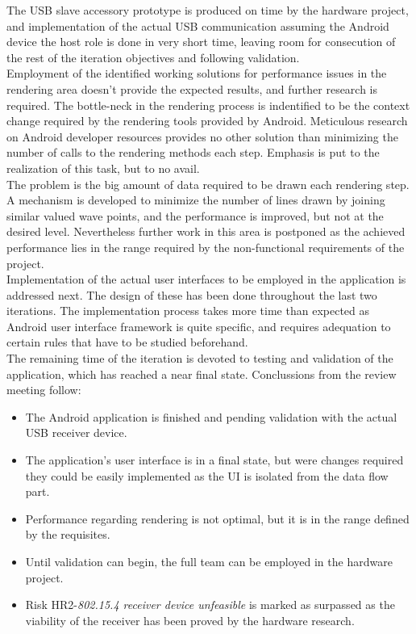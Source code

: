 			The USB slave accessory prototype is produced on time by the hardware project, and implementation of the actual USB communication assuming the Android device the host role is done in very short time, leaving room for consecution of the rest of the iteration objectives and following validation.\\

			Employment of the identified working solutions for performance issues in the rendering area doesn't provide the expected results, and further research is required. The bottle-neck in the rendering process is indentified to be the context change required by the rendering tools provided by Android. Meticulous research on Android developer resources provides no other solution than minimizing the number of calls to the rendering methods each step. Emphasis is put to the realization of this task, but to no avail.\\

			The problem is the big amount of data required to be drawn each rendering step. A mechanism is developed to minimize the number of lines drawn by joining similar valued wave points, and the performance is improved, but not at the desired level. Nevertheless further work in this area is postponed as the achieved performance lies in the range required by the non-functional requirements of the project.\\

			Implementation of the actual user interfaces to be employed in the application is addressed next. The design of these has been done throughout the last two iterations. The implementation process takes more time than expected as	Android user interface framework is quite specific, and requires adequation to certain rules that have to be studied beforehand.\\

			The remaining time of the iteration is devoted to testing and validation of the application, which has reached a near final state. Conclussions from the review meeting follow:
			\begin{itemize}
				\item The Android application is finished and pending validation with the actual USB receiver device.
				\item The application's user interface is in a final state, but were changes required they could be easily implemented as the UI is isolated from the data flow part.
				\item Performance regarding rendering is not optimal, but it is in the range defined by the requisites.
				\item Until validation can begin, the full team can be employed in the hardware project.
				\item Risk HR2-\emph{802.15.4 receiver device unfeasible} is marked as surpassed as the viability of the receiver has been proved by the hardware research.
			\end{itemize}

